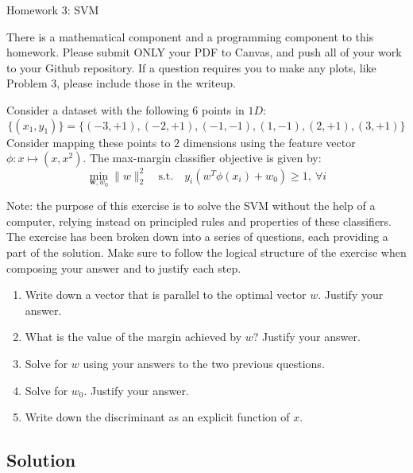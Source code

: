 \documentclass[submit]{harvardml}
\begin{document}
\begin{center}
{\Large Homework 3: SVM}\\
\end{center}

There is a mathematical component and a programming component to this homework.
Please submit ONLY your PDF to Canvas, and push all of your work to your Github
repository. If a question requires you to make any plots, like Problem 3, please
include those in the writeup.

\begin{problem}
Consider a dataset with the following 6 points in $1D$: \[\{(x_1, y_1)\} =\{(-3
, +1 ), (-2 , +1 ) , (-1,  -1 ), ( 1 , -1 ), ( 2 , +1 ), ( 3 , +1 )\}\] Consider
mapping these points to $2$ dimensions using the feature vector $\phi : x
\mapsto (x, x^2)$. The max-margin classifier objective is given by:
\begin{equation}
  \min_{\mathbf{w}, w_0} \|w\|_2^2 \quad \text{s.t.} \quad y_i(w^T\phi(x_i) + w_0)
  \geq 1,~\forall i
\end{equation}

Note: the purpose of this exercise is to solve the SVM without the help of a
computer, relying instead on principled rules and properties of these
classifiers. The exercise has been broken down into a series of questions, each
providing a part of the solution. Make sure to follow the logical structure of
the exercise when composing your answer and to justify each step.

\begin{enumerate}
  \item Write down a vector that is parallel to the optimal vector $w$. Justify
    your answer.
  \item What is the value of the margin achieved by $w$? Justify your
    answer.
  \item Solve for $w$ using your answers to the two previous questions.
  \item Solve for $w_0$. Justify your answer.
  \item Write down the discriminant as an explicit function of $x$.
\end{enumerate}

\end{problem}
\subsection*{Solution}
\end{document}
